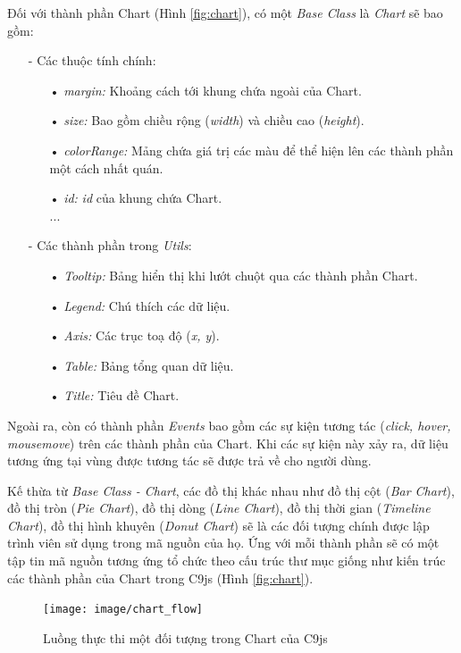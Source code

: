 \documentclass[12pt,a4paper,twoside]{article}
\begin{document}
Đối với thành phần Chart (Hình \ref{fig:chart}), có một \textit{Base Class} là \textit{Chart} sẽ bao gồm:
\begin{itemize}
\item[-] Các thuộc tính chính:
\begin{itemize}
\item[•] \emph{margin:} Khoảng cách tới khung chứa ngoài của Chart.
\item[•] \emph{size:} Bao gồm chiều rộng (\textit{width}) và chiều cao (\textit{height}).
\item[•] \emph{colorRange:} Mảng chứa giá trị các màu để thể hiện lên các thành phần một cách nhất quán.
\item[•] \emph{id:} \textit{id} của khung chứa Chart.\\
...
\end{itemize}
\item[-] Các thành phần trong \textit{Utils}:
\begin{itemize}
\item[•] \emph{Tooltip:} Bảng hiển thị khi lướt chuột qua các thành phần Chart.
\item[•] \emph{Legend:} Chú thích các dữ liệu.
\item[•] \emph{Axis:} Các trục toạ độ (\textit{x, y}).
\item[•] \emph{Table:} Bảng tổng quan dữ liệu.
\item[•] \emph{Title:} Tiêu đề Chart.
\end{itemize}
\end{itemize}

Ngoài ra, còn có thành phần \textit{Events} bao gồm các sự kiện tương tác (\textit{click, hover, mousemove}) trên các thành phần của Chart. Khi các sự kiện này xảy ra, dữ liệu tương ứng tại vùng được tương tác sẽ được trả về cho người dùng.

Kế thừa từ \textit{Base Class - Chart}, các đồ thị khác nhau như đồ thị cột (\textit{Bar Chart}), đồ thị tròn (\textit{Pie Chart}), đồ thị dòng (\textit{Line Chart}), đồ thị thời gian (\textit{Timeline Chart}), đồ thị hình khuyên (\textit{Donut Chart}) sẽ là các đối tượng chính được lập trình viên sử dụng trong mã nguồn của họ. Ứng với mỗi thành phần sẽ có một tập tin mã nguồn tương ứng tổ chức theo cấu trúc thư mục giống như kiến trúc các thành phần của Chart trong C9js (Hình \ref{fig:chart}).

\begin{figure}[!h]
	\begin{center}
    \texttt{[image: image/chart\_flow]}
    \caption{Luồng thực thi một đối tượng trong Chart của C9js}
    \label{fig:chart_flow}
	\end{center}
\end{figure}
\end{document}
